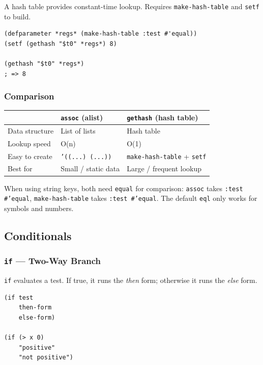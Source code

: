 A hash table provides constant-time lookup.
Requires \texttt{make-hash-table} and \texttt{setf} to build.

\begin{lstlisting}
(defparameter *regs* (make-hash-table :test #'equal))
(setf (gethash "$t0" *regs*) 8)

(gethash "$t0" *regs*)
; => 8
\end{lstlisting}

\subsubsection{Comparison}

\begin{center}
\begin{tabular}{lll}
  \toprule
  & \textbf{\texttt{assoc} (alist)} & \textbf{\texttt{gethash} (hash table)} \\
  \midrule
  Data structure & List of lists & Hash table \\
  Lookup speed   & O(n) & O(1) \\
  Easy to create & \texttt{'((...) (...))} & \texttt{make-hash-table} + \texttt{setf} \\
  Best for       & Small / static data & Large / frequent lookup \\
  \bottomrule
\end{tabular}
\end{center}

When using string keys, both need \texttt{equal} for comparison:
\texttt{assoc} takes \texttt{:test \#'equal},
\texttt{make-hash-table} takes \texttt{:test \#'equal}.
The default \texttt{eql} only works for symbols and numbers.

\subsection{Conditionals}

\subsubsection{\texttt{if} --- Two-Way Branch}

\texttt{if} evaluates a test. If true, it runs the \emph{then} form;
otherwise it runs the \emph{else} form.

\begin{lstlisting}
(if test
    then-form
    else-form)

(if (> x 0)
    "positive"
    "not positive")
\end{lstlisting}

